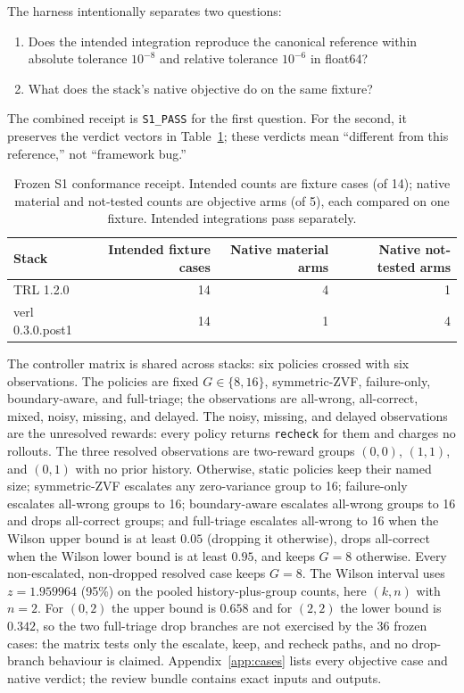 \documentclass{article}
\begin{document}
The harness intentionally separates two questions:
\begin{enumerate}[leftmargin=*,itemsep=2pt]
  \item Does the intended integration reproduce the canonical reference within
  absolute tolerance $10^{-8}$ and relative tolerance $10^{-6}$ in float64?
  \item What does the stack's native objective do on the same fixture?
\end{enumerate}
The combined receipt is \texttt{S1\_PASS} for the first question.  For the
second, it preserves the verdict vectors in Table~\ref{tab:s1}; these verdicts
mean ``different from this reference,'' not ``framework bug.''

\begin{table}[t]
  \centering
  \caption{Frozen S1 conformance receipt. Intended counts are fixture cases
  (of 14); native material and not-tested counts are objective arms (of 5),
  each compared on one fixture.  Intended integrations pass separately.}
  \label{tab:s1}
  \begin{tabular}{lrrr}
    \toprule
    Stack & Intended fixture cases & Native material arms & Native not-tested arms \\
    \midrule
    TRL 1.2.0 & 14 & 4 & 1 \\
    verl 0.3.0.post1 & 14 & 1 & 4 \\
    \bottomrule
  \end{tabular}
\end{table}

The controller matrix is shared across stacks: six policies crossed with six
observations.  The policies are fixed $G\in\{8,16\}$, symmetric-ZVF,
failure-only, boundary-aware, and full-triage; the observations are all-wrong,
all-correct, mixed, noisy, missing, and delayed.  The noisy, missing, and
delayed observations are the unresolved rewards: every policy returns
\texttt{recheck} for them and charges no rollouts.  The three resolved
observations are two-reward groups $(0,0)$, $(1,1)$, and $(0,1)$ with no prior
history.  Otherwise, static policies keep their named size; symmetric-ZVF
escalates any zero-variance group to 16; failure-only escalates all-wrong
groups to 16; boundary-aware escalates all-wrong groups to 16 and drops
all-correct groups; and full-triage escalates all-wrong to 16 when the Wilson
upper bound is at least $0.05$ (dropping it otherwise), drops all-correct when
the Wilson lower bound is at least $0.95$, and keeps $G=8$ otherwise.  Every
non-escalated, non-dropped resolved case keeps $G=8$.  The Wilson interval \citep{wilson1927probable} uses
$z=1.959964$ (95\%) on the pooled history-plus-group counts, here $(k,n)$ with
$n=2$.  For $(0,2)$ the upper bound is $0.658$ and for $(2,2)$ the lower bound
is $0.342$, so the two full-triage drop branches are not exercised by the 36
frozen cases: the matrix tests only the escalate, keep, and recheck paths,
and no drop-branch behaviour is claimed.
Appendix~\ref{app:cases} lists every objective case and native verdict; the
review bundle contains exact inputs and outputs.
\end{document}
